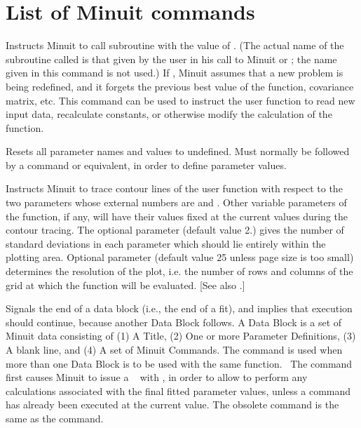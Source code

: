 \section*{List of Minuit commands}


Instructs Minuit to call subroutine  with the value of
.
(The actual name of the subroutine called is that given by the user
in his call to Minuit or ;
the name given in this command is not used.)
If , Minuit assumes that a new problem is being
redefined, and it forgets the previous best value of the function,
covariance matrix, etc.
This command can be used to instruct the user function to read new
input data, recalculate constants, or otherwise modify the calculation
of the function.


Resets all parameter names and values to undefined. Must normally be
followed by a  command or equivalent, in order to define
parameter values.


Instructs Minuit to trace contour lines of the user function with
respect to the two parameters whose external numbers are 
and .
Other variable parameters of the function, if any, will have their
values fixed at the current values during the contour tracing.
The optional parameter \Lit{[devs]} (default value 2.) gives the number of
standard deviations in each parameter which should lie entirely within
the plotting area. 
Optional parameter \Lit{[ngrid]} (default value 25 unless
page size is too small) determines the resolution of the plot, i.e.
the number of rows and columns of the grid at which the function
will be evaluated. [See also .]


Signals the end of a data block (i.e., the end of a fit), and implies that
execution should continue, because another Data Block follows.  
A Data Block is a set of Minuit data
consisting of (1) A Title, (2) One or more Parameter Definitions,
(3) A blank line, and (4) A set of Minuit Commands.
The  command is used when more than one Data Block is to be used
with the same  function.
~The  command first causes Minuit to issue a ~
with ,
in order to allow  to perform any calculations associated with
the final fitted parameter values,
unless a  command has already been executed
at the current  value.
The obsolete command 
is the same as the  command.

